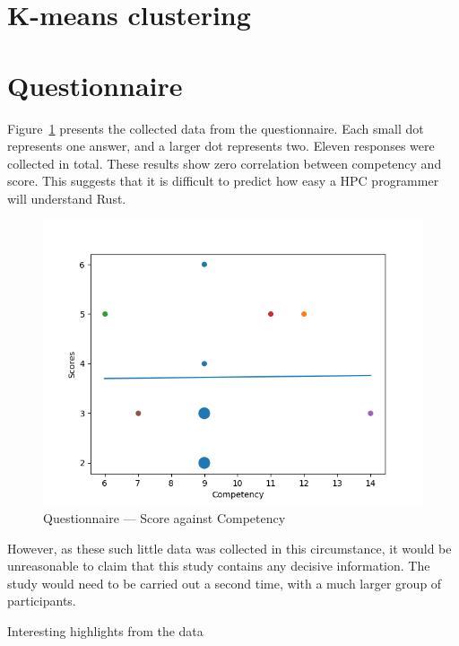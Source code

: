 \section{K-means clustering}
\section{Questionnaire}
Figure~\ref{fig:questions} presents the collected data from the questionnaire. Each small dot represents one answer, and a larger dot represents two. Eleven responses were collected in total.
These results show zero correlation between competency and score. This suggests that it is difficult to predict how easy a HPC programmer will understand Rust. 

\begin{figure}[h]
\centering
\includegraphics[width=.8\linewidth]{figs/questions/scatter.png}
\caption{Questionnaire --- Score against Competency}\label{fig:questions}
\end{figure}

However, as these such little data was collected in this circumstance, it would be unreasonable to claim that this study contains any decisive information. The study would need to be carried out a second time, with a much larger group of participants.

Interesting highlights from the data 
